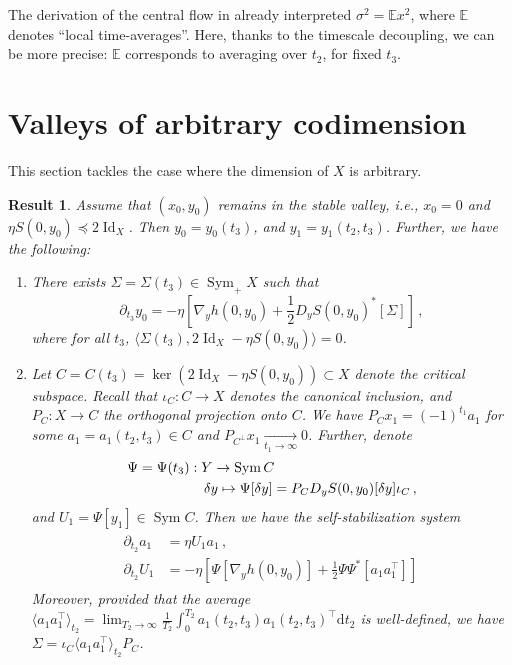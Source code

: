 \documentclass[11pt,english,reqno]{article}
\DeclareMathOperator{\Id}{Id}
\DeclareMathOperator{\Sym}{Sym}
\newcommand{\diff}{\mathrm{d}}
\newcommand{\E}{\mathbb{E}}
\theoremstyle{plain}
\newtheorem{result}[proposition]{Result}
\theoremstyle{definition}
\theoremstyle{remark}
\numberwithin{equation}{section}
\begin{document}
    The derivation of the central flow in \cite{cohen2024understanding} already interpreted $\sigma^2 = \E x^2 $, where $\E$ denotes ``local time-averages''. Here, thanks to the timescale decoupling, we can be more precise: $\E$ corresponds to averaging over $t_2$, for fixed $t_3$.




\section{Valleys of arbitrary codimension}
\label{sec:general}

This section tackles the case where the dimension of $X$ is arbitrary. 

\begin{result}
    \label{result:general}
    Assume that $(x_0, y_0)$ remains in the stable valley, i.e., $x_0 = 0$ and $\eta S(0,y_0) \preceq 2 \Id_X$. Then $y_0 = y_0(t_3)$, and $y_1 = y_1(t_2, t_3)$. Further, we have the following:
    \begin{enumerate}[label=(\roman*)]
        \item\label{it:general-1} There exists $\Sigma = \Sigma(t_3) \in \Sym_+ X$ such that 
        \begin{equation*}
            \partial_{t_3} y_0 = - \eta \left[\nabla_y h(0, y_0) + \frac{1}{2} D_y S(0, y_0)^*[\Sigma]\right] \, ,
        \end{equation*}
        where for all $t_3$, $\langle \Sigma(t_3), 2 \Id_X - \eta S(0,y_0)\rangle = 0$. 
        \item Let $C = C(t_3) = \ker(2 \Id_X - \eta S(0, y_0)) \subset X$ denote the critical subspace. Recall that $\iota_C : C \to X$ denotes the canonical inclusion, and $P_C : X \to C$ the orthogonal projection onto $C$. We have $P_C x_1 = (-1)^{t_1} a_1$ for some $a_1 = a_1(t_2, t_3) \in C$ and $P_{C^\perp}x_1 \xrightarrow[t_1 \to \infty]{} 0$. Further, denote 
        \begin{align*}
            &\Psi = \Psi(t_3): Y \to \Sym C \\
            &\hspace{5.5em} \delta y \mapsto \Psi[\delta y] = P_C D_y S(0, y_0)[\delta y] \iota_C \, ,
        \end{align*}
        and $U_1 = \Psi[y_1] \in \Sym C$. Then we have the self-stabilization system
        \begin{align}
            \label{eq:self-stab-general}
            \begin{split}
            \partial_{t_2} a_1 &= \eta U_1 a_1 \, , \\
            \partial_{t_2} U_1 &= - \eta \left[ \Psi[\nabla_y h(0, y_0)] + \frac{1}{2} \Psi\Psi^*[a_1 a_1^\top ]\right] \, 
            \end{split}
        \end{align}
        Moreover, provided that the average $\langle a_1 a_1^\top \rangle_{t_2} = \lim_{T_2 \to \infty} \frac{1}{T_2} \int_0^{T_2} a_1(t_2, t_3)a_1(t_2, t_3)^\top \diff t_2$ is well-defined, we have $\Sigma = \iota_C \langle a_1 a_1^\top \rangle_{t_2} P_C$. 
    \end{enumerate}
\end{result}
\end{document}
